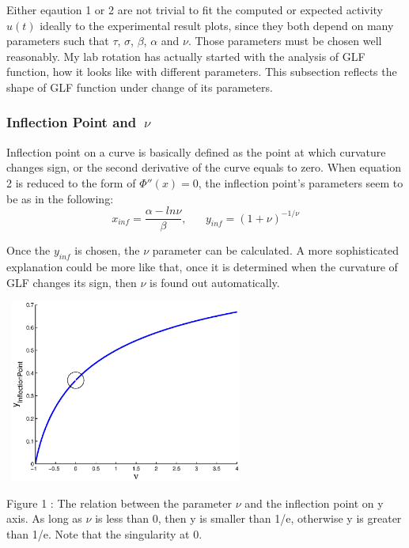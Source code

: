 \documentclass[twocolumn]{article}
\begin{document}
Either eqaution 1 or 2 are not trivial to fit the computed or expected activity $u(t)$ ideally to the experimental result plots, since they both depend on many parameters such that $\tau$, $\sigma$, $\beta$, $\alpha$ and $\nu$. Those parameters must be chosen well reasonably. My lab rotation has actually started with the analysis of GLF function, how it looks like with different parameters. This subsection reflects the shape of GLF function under change of its parameters.

 
\subsubsection{Inflection Point and $~ \nu$}
Inflection point on a curve is basically defined as the point at which curvature changes sign, or the second derivative of the curve equals to zero. When equation 2 is reduced to the form of $\Phi''(x)=0$, the inflection point's parameters seem to be as in the following:
\begin{equation*}
 x_{inf}=\dfrac{\alpha-ln\nu}{\beta},   \;\;\;\;\;\;        y_{inf}=(1+\nu)^{-1/\nu}
\end{equation*}

Once the $y_{inf}$ is chosen, the $\nu$ parameter can be calculated. A more sophisticated explanation could be more like that, once it is determined when the curvature of GLF changes its sign, then $\nu$ is found out automatically.  

\begin{center}
\includegraphics[width=80mm,height=60mm]{inflection_point.eps} 
   \begin{footnotesize} Figure 1 : The relation between the parameter $\nu$ and the inflection point on y axis. As long as $\nu$ is less than 0, then y is smaller than 1/e, otherwise y is greater than 1/e. Note that the singularity at 0.  \end{footnotesize}
\end{center}
\end{document}
